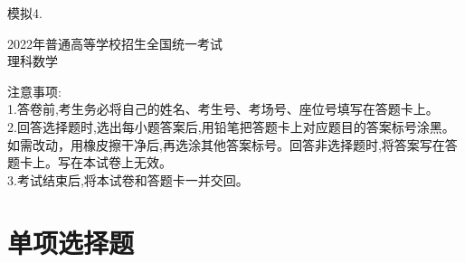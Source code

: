 \documentclass[11pt]{article}
\begin{document}
	\heiti 模拟4.
	\begin{center}
		\songti \huge 2022年普通高等学校招生全国统一考试
		\\
		\heiti \Huge 理科数学
	\end{center}
	\heiti 注意事项:
	\\ \songti 1.答卷前,考生务必将自己的姓名、考生号、考场号、座位号填写在答题卡上。
	\\ 2.回答选择题时,选出每小题答案后,用铅笔把答题卡上对应题目的答案标号涂黑。如需改动，用橡皮擦干净后,再选涂其他答案标号。回答非选择题时,将答案写在答题卡上。写在本试卷上无效。
	\\ 3.考试结束后,将本试卷和答题卡一并交回。

\section{\heiti 单项选择题}
\end{document}
